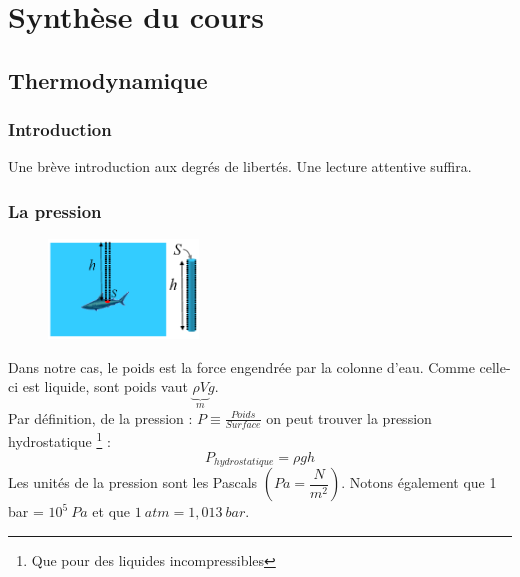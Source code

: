 \documentclass	[11pt, a4paper, openany]{book}
\begin{document}
\mainmatter
\part{Synthèse du cours}
\chapter{Thermodynamique}
\section{Introduction}
Une brève introduction aux degrés de libertés. Une lecture attentive suffira.

\section{La pression}

\begin{figure}
\includegraphics[width=4cm]{th/image1.png}
\end{figure}

Dans notre cas, le poids est la force engendrée par la colonne d'eau. Comme celle-ci est liquide, sont poids vaut $\underbrace{\rho V}_m  g$.\\
Par définition, de la pression : $P \equiv \frac{Poids}{Surface}$ on peut trouver la pression hydrostatique \footnote{Que pour des liquides incompressibles} :
\begin{equation}
P_{hydrostatique} = \rho g h
\end{equation}
Les unités de la pression sont les Pascals $\left(Pa = \dfrac{N}{m^2}\right)$. Notons également que 1 bar = $10^5\ Pa$ et que $1\ atm = 1,013\ bar$.
\end{document}
